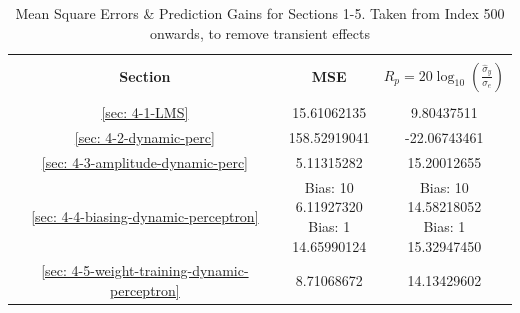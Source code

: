 \documentclass[12pt]{article}
\begin{document}
		\begin{minipage}[t]{0.45\textwidth}
			\begin{table}[H]
				\centering
				\begin{tabular}{|c|c|c|}
					\hline
					&&\\[-1em]
					\textbf{Section} & \textbf{MSE} & \textbf{$R_p = 20\log_{10}({\frac{\hat{\sigma}_y}{\sigma_e}})$} \\
					&&\\[-1em]
					\hline
					\hline
					\ref{sec: 4-1-LMS}	&	15.61062135		&	9.80437511 \\
					\hline
					\ref{sec: 4-2-dynamic-perc}	&	158.52919041	&	-22.06743461 \\
					\hline
					\ref{sec: 4-3-amplitude-dynamic-perc}	&	5.11315282		&	15.20012655 \\
					\hline
					\ref{sec: 4-4-biasing-dynamic-perceptron} 	&	\makecell{ Bias: 10 \\ 6.11927320 \\ Bias: 1 \\ 14.65990124 \\}		&	\makecell{ Bias: 10 \\ 14.58218052 \\ Bias: 1 \\ 15.32947450 \\} \\
					\hline
					\ref{sec: 4-5-weight-training-dynamic-perceptron}	&	8.71068672		&	14.13429602 \\
					\hline
				\end{tabular}
				\captionsetup{justification=centering}
				\caption{Mean Square Errors \& Prediction Gains for Sections 1-5. Taken from Index 500 onwards, to remove transient effects}
				\label{tab: 4-mse-Rp-500+}
			\end{table}
		\end{minipage}%
		
	
\end{document}
